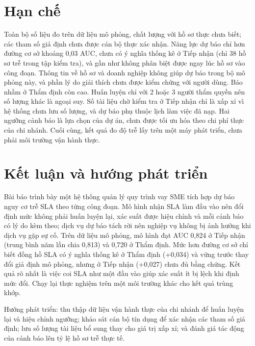 \documentclass[journal]{IEEEtran}
\begin{document}
\section{Hạn chế}
Toàn bộ số liệu đo trên dữ liệu mô phỏng, chất lượng với hồ sơ thực chưa biết; các tham số giả định chưa được cán bộ thực xác nhận. Năng lực dự báo chỉ hơn đường cơ sở khoảng 0,03 AUC, chưa có ý nghĩa thống kê ở Tiếp nhận (chỉ 38 hồ sơ trễ trong tập kiểm tra), và gần như không phân biệt được ngay lúc hồ sơ vào công đoạn. Thông tin về hồ sơ và doanh nghiệp không giúp dự báo trong bộ mô phỏng này, và phần lý do giải thích chưa được kiểm chứng với người dùng. Báo nhầm ở Thẩm định còn cao. Huấn luyện chỉ với 2 hoặc 3 người thẩm quyền nên số lượng khác là ngoại suy. Số tài liệu chờ kiểm tra ở Tiếp nhận chỉ là xấp xỉ vì hệ thống chưa lưu số lượng, và dự báo phụ thuộc lịch làm việc đã nạp. Hai ngưỡng cảnh báo là lựa chọn của dự án, chưa được tối ưu hóa theo chi phí thực của chi nhánh. Cuối cùng, kết quả đo độ trễ lấy trên một máy phát triển, chưa phải môi trường vận hành thực.

\section{Kết luận và hướng phát triển}
Bài báo trình bày một hệ thống quản lý quy trình vay SME tích hợp dự báo nguy cơ trễ SLA theo từng công đoạn. Mô hình nhận SLA làm đầu vào nên đổi định mức không phải huấn luyện lại, xác suất được hiệu chỉnh và mỗi cảnh báo có lý do kèm theo; dịch vụ dự báo tách rời nên nghiệp vụ không bị ảnh hưởng khi dịch vụ gặp sự cố. Trên dữ liệu mô phỏng, mô hình đạt AUC 0,824 ở Tiếp nhận (trung bình năm lần chia 0,813) và 0,720 ở Thẩm định. Mức hơn đường cơ sở chỉ biết đồng hồ SLA có ý nghĩa thống kê ở Thẩm định (+0,034) và vững trước thay đổi giả định mô phỏng, nhưng ở Tiếp nhận (+0,027) chưa đủ bằng chứng. Kết quả rõ nhất là việc coi SLA như một đầu vào giúp xác suất ít bị lệch khi định mức đổi. Chạy lại thực nghiệm trên một môi trường khác cho kết quả trùng khớp.

Hướng phát triển: thu thập dữ liệu vận hành thực của chi nhánh để huấn luyện lại và hiệu chỉnh ngưỡng; khảo sát cán bộ tín dụng để xác nhận các tham số giả định; lưu số lượng tài liệu bổ sung thay cho giá trị xấp xỉ; và đánh giá tác động của cảnh báo lên tỷ lệ hồ sơ trễ thực tế.
\end{document}
